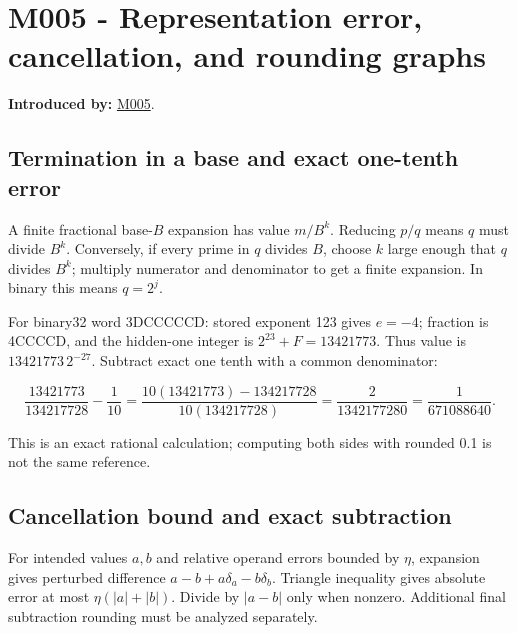 \section{M005 - Representation error, cancellation, and rounding graphs}\label{01-foundations-i-ch011-m005---representation-error-cancellation-and-rounding-graphs}

\hypertarget{01-foundations-i-ch011-m005---representation-error-cancellation-and-rounding-graphs}{}

\textbf{Introduced by:} \hyperref[01-foundations-i-ch001-when-arithmetic-meets-uncertainty]{M005}.

\subsection{Termination in a base and exact one-tenth error}\label{01-foundations-i-ch011-termination-in-a-base-and-exact-one-tenth-error}

\hypertarget{01-foundations-i-ch011-termination-in-a-base-and-exact-one-tenth-error}{}

A finite fractional base-\(B\) expansion has value \(m/B^k\). Reducing \(p/q\) means \(q\) must divide \(B^k\). Conversely, if every prime in \(q\) divides \(B\), choose \(k\) large enough that \(q\) divides \(B^k\); multiply numerator and denominator to get a finite expansion. In binary this means \(q=2^j\).

For binary32 word 3DCCCCCD: stored exponent 123 gives \(e=-4\); fraction is 4CCCCD, and the hidden-one integer is \(2^{23}+F=13421773\). Thus value is \(13421773\,2^{-27}\). Subtract exact one tenth with a common denominator:

\[
\frac{13421773}{134217728}-\frac1{10}
=\frac{10(13421773)-134217728}{10(134217728)}
=\frac{2}{1342177280}=\frac1{671088640}.
\]

This is an exact rational calculation; computing both sides with rounded 0.1 is not the same reference.

\subsection{Cancellation bound and exact subtraction}\label{01-foundations-i-ch011-cancellation-bound-and-exact-subtraction}

\hypertarget{01-foundations-i-ch011-cancellation-bound-and-exact-subtraction}{}

For intended values \(a,b\) and relative operand errors bounded by \(\eta\), expansion gives perturbed difference \(a-b+a\delta_a-b\delta_b\). Triangle inequality gives absolute error at most \(\eta(|a|+|b|)\). Divide by \(|a-b|\) only when nonzero. Additional final subtraction rounding must be analyzed separately.

